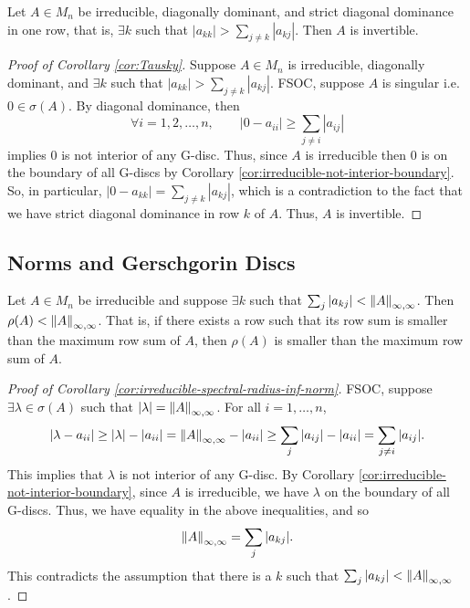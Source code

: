 \begin{corollary}[Tausky]
\label{cor:Tausky}
Let $A \in M_n$ be irreducible, diagonally dominant, and strict diagonal dominance in one row, that is, $\exists k$ such that $|a_{kk}| > \sum_{j\not=k}|a_{kj}|$. Then $A$ is invertible.
\end{corollary}
\begin{proof}[Proof of Corollary \ref{cor:Tausky}]
Suppose $A \in M_n$ is irreducible, diagonally dominant, and $\exists k$ such that $|a_{kk}| > \sum_{j\not=k} |a_{kj}|$. FSOC, suppose $A$ is singular i.e. $0 \in \sigma(A)$. By diagonal dominance, then
\[
\forall i = 1,2,\dots,n, \quad \quad |0 - a_{ii}|\ge\sum_{j\not=i}|a_{ij}|
\]
implies 0 is not interior of any G-disc. Thus, since $A$ is irreducible then $0$ is on the boundary of all G-discs by Corollary \ref{cor:irreducible-not-interior-boundary}. So, in particular, $|0-a_{kk}| = \sum_{j\not=k}|a_{kj}|$, which is a contradiction to the fact that we have strict diagonal dominance in row $k$ of $A$. Thus, $A$ is invertible.
\end{proof}

\subsection{Norms and Gerschgorin Discs}
\begin{corollary}
\label{cor:irreducible-spectral-radius-inf-norm}
Let $A \in M_n$ be irreducible and suppose $\exists k$ such that $\sum_j |a_{kj}| < \left\lVert A\right\rVert_{\infty,\infty}$. Then $\rho(A) < \left\lVert A\right\rVert_{\infty,\infty}$. That is, if there exists a row such that its row sum is smaller than the maximum row sum of $A$, then $\rho(A)$ is smaller than the maximum row sum of $A$.
\end{corollary}
\begin{proof}[Proof of Corollary \ref{cor:irreducible-spectral-radius-inf-norm}]
FSOC, suppose $\exists \lambda \in \sigma(A)$ such that $|\lambda| = \left\lVert A\right\rVert_{\infty,\infty}$. For all $i=1,\dots,n$, 
\[
|\lambda-a_{ii}| \ge |\lambda| - |a_{ii}| = \left\lVert A\right\rVert_{\infty,\infty} - |a_{ii}| \ge \sum_j|a_{ij}| - |a_{ii}| = \sum_{j\not=i}|a_{ij}|.
\]
This implies that $\lambda$ is not interior of any G-disc. By Corollary \ref{cor:irreducible-not-interior-boundary}, since $A$ is irreducible, we have $\lambda$ on the boundary of all G-discs. Thus, we have equality in the above inequalities, and so 
\[
    \left\lVert A\right\rVert_{\infty, \infty} = \sum_{j}|a_{kj}|.
\]
This contradicts the assumption that there is a $k$ such that $\sum_j |a_{kj}| < \left\lVert A\right\rVert_{\infty,\infty}$.
\end{proof}

